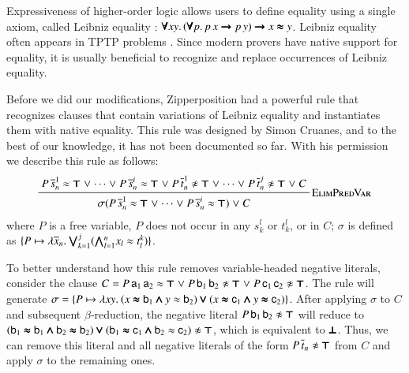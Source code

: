 Expressiveness of higher-order logic allows users to define equality using a single axiom,
called Leibniz equality \cite{pa-01-classical-ty-thy}:
%
$ \pmb{\forall} xy. \,
   (\pmb{\forall} p. \, p \, x \pmb{\rightarrow} p \, y) \pmb{\rightarrow} x \pmb{\approx} y$.
%
Leibniz equality often appears in TPTP problems  \cite{gs-17-tptp}. Since modern provers have native support
for equality, it is usually beneficial to recognize and replace occurrences of Leibniz equality.

Before we did our modifications, Zipperposition had a powerful rule that
recognizes clauses that contain variations of Leibniz equality and instantiates
them with native equality. This rule was designed by Simon Cruanes, and to the
best of our knowledge, it has not been documented so far. With his permission
we describe this rule as follows:
\pagebreak[2]
%
$$\namedinference{ElimPredVar}{P \, \overline{s}_n^1 \eq \itrue \llor \cdots \llor
    P \, \overline{s}_n^i \eq \itrue \llor P \, \overline{t}_n^1 \noteq \itrue \llor
    \cdots \llor P \, \overline{t}_n^j \noteq \itrue \llor C} 
    {\sigmacl{P \, \overline{s}_n^1
    \eq \itrue \llor \cdots \llor P \, \overline{s}_n^i \eq \itrue} \llor C} $$
where $P$ is a free variable, $P$ does not occur in any $s_k^l$ or $t_k^l$, or
in $C$; $\sigma$ is defined as $\{ P \mapsto \lambda \overline{x}_{n}.\> \pmb{\bigvee}_{k=1}^{j}
(\pmb{\bigwedge}_{l=1}^{n} x_l \approx t^k_l )  \}$. 

To better understand how this rule removes variable-headed negative literals,
consider the clause $C = P \, \mathsf{a}_1 \, \mathsf{a}_2 \approx \pmb{\top} \mathrel\lor P \,
\mathsf{b}_1 \, \mathsf{b}_2 \not\approx \pmb{\top} \mathrel\lor P \, \mathsf{c}_1 \, \mathsf{c}_2 \not\approx
\pmb{\top}$. The rule 
will generate $\sigma = \{ P \mapsto \lambda xy.\> (x \pmb{\approx} \mathsf{b}_1
\pmb{\land} y \approx \mathsf{b}_2) \pmb{\lor} (x \pmb{\approx} \mathsf{c}_1 \pmb{\land} y \pmb{\approx} \mathsf{c}_2)   \}$.
After applying $\sigma$ to $C$ and subsequent $\beta$-reduction, the negative literal
$  P \, \mathsf{b}_1 \, \mathsf{b}_2 \not\approx \pmb{\top}$ will reduce to 
$ (\cst{b}_1 \ieq \cst{b}_1 \iand \cst{b}_2 \ieq \cst{b}_2) \ior (\cst{b}_1 \ieq \cst{c}_1 \iand \cst{b}_2 \eq \cst{c}_2) \noteq \itrue $,
which is equivalent to $\pmb{\bot}$. Thus, we can remove this literal and all negative literals
of the form $P \, \overline{t}_n \noteq \itrue$ from $C$ and apply $\sigma$ to the remaining ones.

